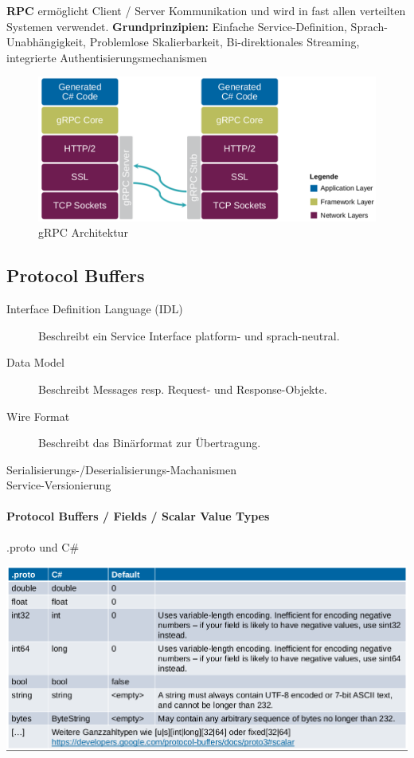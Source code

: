 \documentclass[
a4paper,
oneside,
10pt,
fleqn,
headsepline,
toc=listofnumbered, 
bibliography=totocnumbered]{scrartcl}
\begin{document}
\textbf{RPC} ermöglicht Client / Server Kommunikation und wird in fast allen verteilten Systemen verwendet.
\textbf{Grundprinzipien:} Einfache Service-Definition, Sprach-Unabhängigkeit, Problemlose Skalierbarkeit, Bi-direktionales Streaming, integrierte Authentisierungsmechanismen
\begin{figure}[!ht]
	\centering
	\includegraphics[width=0.6\linewidth]{images/grpc_architektur.png}
	\caption{gRPC Architektur}
	\label{fig:grpcarchitektur}
\end{figure}

\subsection{Protocol Buffers}
\begin{description}
	\item[Interface Definition Language (IDL)] Beschreibt ein Service Interface platform- und sprach-neutral.
	\item[Data Model] Beschreibt Messages resp. Request- und Response-Objekte.
	\item[Wire Format] Beschreibt das Binärformat zur Übertragung.
	\item[Serialisierungs-/Deserialisierungs-Machanismen]
	\item[Service-Versionierung]
\end{description}

\paragraph{Protocol Buffers / Fields / Scalar Value Types} .proto und C\#

\begin{minipage}[t]{0.9\textwidth}
	\centering
	\includegraphics[width=0.9\linewidth]{images/grpc_buffers.png}
\end{minipage}
\end{document}
